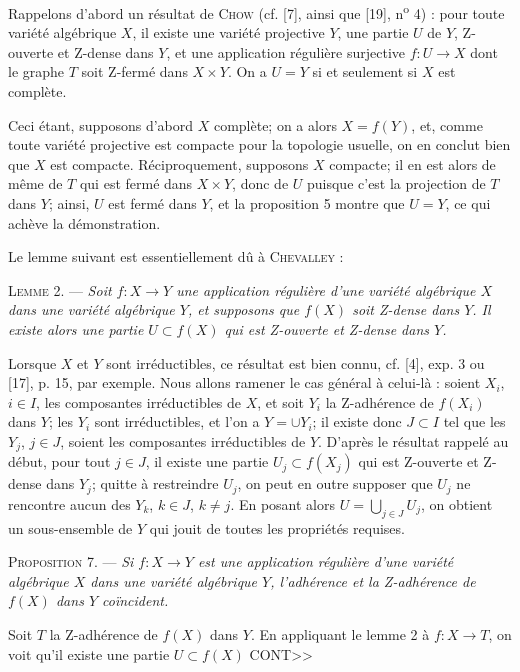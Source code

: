 Rappelons d'abord un résultat de \textsc{Chow} (cf. [7], ainsi que [19], n\textsuperscript{o} 4) : pour toute variété algébrique $X$, il existe une variété projective $Y$, une partie $U$ de $Y$, Z-ouverte et Z-dense dans $Y$, et une application régulière surjective $f : U \to X$ dont le graphe $T$ soit Z-fermé dans $X \times Y$. On a $U = Y$ si et seulement si $X$ est complète.

Ceci étant, supposons d'abord $X$ complète; on a alors $X = f(Y)$, et, comme toute variété projective est compacte pour la topologie usuelle, on en conclut bien que $X$ est compacte. Réciproquement, supposons $X$ compacte; il en est alors de même de $T$ qui est fermé dans $X \times Y$, donc de $U$ puisque c'est la projection de $T$ dans $Y$; ainsi, $U$ est fermé dans $Y$, et la proposition 5 montre que $U = Y$, ce qui achève la démonstration.

Le lemme suivant est essentiellement dû à \textsc{Chevalley} :

\textsc{Lemme} 2. — \textit{Soit $f : X \to Y$ une application régulière d'une variété algébrique $X$ dans une variété algébrique $Y$, et supposons que $f(X)$ soit Z-dense dans $Y$. Il existe alors une partie $U \subset f(X)$ qui est Z-ouverte et Z-dense dans $Y$.}

Lorsque $X$ et $Y$ sont irréductibles, ce résultat est bien connu, cf. [4], exp. 3 ou [17], p. 15, par exemple. Nous allons ramener le cas général à celui-là : soient $X_i$, $i \in I$, les composantes irréductibles de $X$, et soit $Y_i$ la Z-adhérence de $f(X_i)$ dans $Y$; les $Y_i$ sont irréductibles, et l'on a $Y = \cup Y_i$; il existe donc $J \subset I$ tel que les $Y_j$, $j \in J$, soient les composantes irréductibles de $Y$. D'après le résultat rappelé au début, pour tout $j \in J$, il existe une partie $U_j \subset f(X_j)$ qui est Z-ouverte et Z-dense dans $Y_j$; quitte à restreindre $U_j$, on peut en outre supposer que $U_j$ ne rencontre aucun des $Y_k$, $k \in J$, $k \neq j$. En posant alors $U = \bigcup_{j \in J} U_j$, on obtient un sous-ensemble de $Y$ qui jouit de toutes les propriétés requises.

\textsc{Proposition} 7. — \textit{Si $f : X \to Y$ est une application régulière d'une variété algébrique $X$ dans une variété algébrique $Y$, l'adhérence et la Z-adhérence de $f(X)$ dans $Y$ coïncident.}

Soit $T$ la Z-adhérence de $f(X)$ dans $Y$. En appliquant le lemme 2 à $f : X \to T$, on voit qu'il existe une partie $U \subset f(X)$ CONT>>


